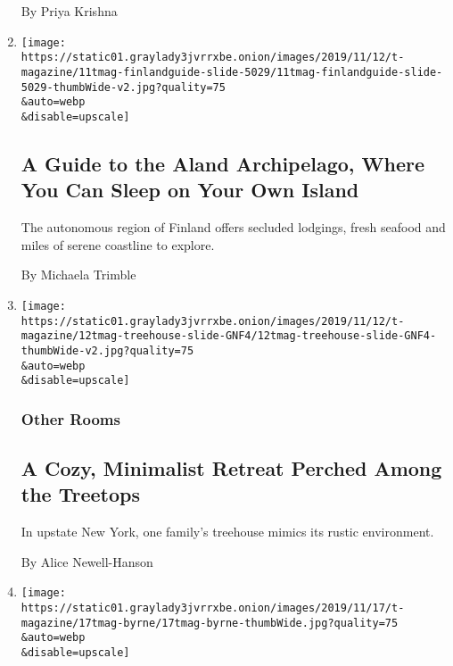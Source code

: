 \begin{enumerate}
  By Priya Krishna
\item
  \href{/2019/11/12/t-magazine/aland-islands-travel-guide.html}{}

  \texttt{[image: https://static01.graylady3jvrrxbe.onion/images/2019/11/12/t-magazine/11tmag-finlandguide-slide-5029/11tmag-finlandguide-slide-5029-thumbWide-v2.jpg?quality=75\\\&auto=webp\\\&disable=upscale]}

  \hypertarget{a-guide-to-the-aland-archipelago-where-you-can-sleep-on-your-own-island}{%
  \subsection{A Guide to the Aland Archipelago, Where You Can Sleep on
  Your Own
  Island}\label{a-guide-to-the-aland-archipelago-where-you-can-sleep-on-your-own-island}}

  The autonomous region of Finland offers secluded lodgings, fresh
  seafood and miles of serene coastline to explore.

  By Michaela Trimble
\item
  \href{/2019/11/11/t-magazine/willow-treehouse.html}{}

  \texttt{[image: https://static01.graylady3jvrrxbe.onion/images/2019/11/12/t-magazine/12tmag-treehouse-slide-GNF4/12tmag-treehouse-slide-GNF4-thumbWide-v2.jpg?quality=75\\\&auto=webp\\\&disable=upscale]}

  \hypertarget{other-rooms}{%
  \subsubsection{Other Rooms}\label{other-rooms}}

  \hypertarget{a-cozy-minimalist-retreat-perched-among-the-treetops}{%
  \subsection{A Cozy, Minimalist Retreat Perched Among the
  Treetops}\label{a-cozy-minimalist-retreat-perched-among-the-treetops}}

  In upstate New York, one family's treehouse mimics its rustic
  environment.

  By Alice Newell-Hanson
\item
  \href{/2019/11/11/t-magazine/david-byrne-binder.html}{}

  \texttt{[image: https://static01.graylady3jvrrxbe.onion/images/2019/11/17/t-magazine/17tmag-byrne/17tmag-byrne-thumbWide.jpg?quality=75\\\&auto=webp\\\&disable=upscale]}


\end{enumerate}
